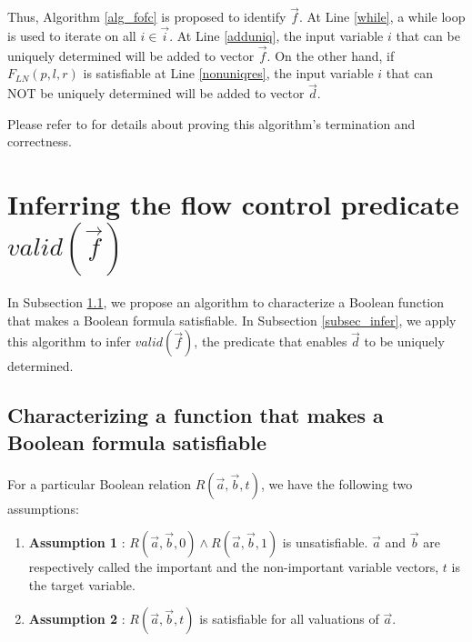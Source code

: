 \documentclass[runningheads,a4paper,orivec]{llncs}
\begin{document}
Thus,
Algorithm \ref{alg_fofc} is proposed to identify $\vec{f}$.
At Line \ref{while},
a while loop is used to iterate on all $i\in\vec{i}$.
At Line \ref{adduniq},
the input variable $i$ that can be uniquely determined will be added to vector $\vec{f}$.
On the other hand,
if $F_{LN}(p,l,r)$ is satisfiable at Line \ref{nonuniqres},
the input variable $i$ that can NOT be uniquely determined will be added to vector $\vec{d}$.

Please refer to \cite{QinTODAES15} for details about proving this algorithm's termination and correctness.


\section{Inferring the flow control predicate $valid(\vec{f})$}



In Subsection \ref{subsec_craig},
we propose  an algorithm 
to characterize a Boolean function that makes a Boolean formula satisfiable.
In Subsection \ref{subsec_infer},
we apply this algorithm to infer $valid(\vec{f})$,
the predicate that enables $\vec{d}$ to be uniquely determined.


\subsection{Characterizing a function that makes a Boolean formula satisfiable}\label{subsec_craig}

For a particular Boolean relation $R(\vec{a},\vec{b},t)$, 
we have the following two assumptions:
\begin{enumerate}
\item \textbf{Assumption 1} :
$R(\vec{a},\vec{b},0)\wedge R(\vec{a},\vec{b},1)$ is unsatisfiable.
$\vec{a}$ and $\vec{b}$ are respectively called the important and the non-important variable vectors,
$t$ is the target variable.
\item \textbf{Assumption 2} :
$R(\vec{a},\vec{b},t)$ is satisfiable for all valuations of $\vec{a}$.
\end{enumerate}
\end{document}
